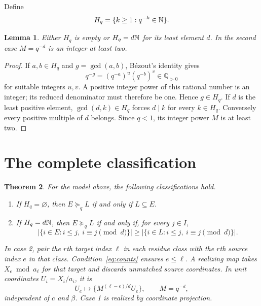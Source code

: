 \documentclass[11pt,a4paper]{article}
\newtheorem{theorem}{Theorem}[section]\newtheorem{lemma}[theorem]{Lemma}
\theoremstyle{remark}\newtheorem*{ednote}{Editorial note (ProveIt, 2026-10-01)}
\begin{document}
Define
\begin{equation}\label{eq:H}
 H_q=\{k\ge1:q^{-k}\in\mathbb N\}.
\end{equation}

\begin{lemma}\label{lem:arithmetic}
Either $H_q$ is empty or $H_q=d\mathbb N$ for its least element $d$. In the second case $M=q^{-d}$ is an integer at least two.
\end{lemma}
\begin{proof}
If $a,b\in H_q$ and $g=\gcd(a,b)$, B\'ezout's identity gives
\[
 q^{-g}=(q^{-a})^u(q^{-b})^v\in\mathbb Q_{>0}
\]
for suitable integers $u,v$. A positive integer power of this rational number is an integer; its reduced denominator must therefore be one. Hence $g\in H_q$. If $d$ is the least positive element, $\gcd(d,k)\in H_q$ forces $d\mid k$ for every $k\in H_q$. Conversely every positive multiple of $d$ belongs. Since $q<1$, its integer power $M$ is at least two.
\end{proof}

\section{The complete classification}
\begin{theorem}\label{thm:main}
For the model above, the following classifications hold.
\begin{enumerate}
 \item If $H_q=\varnothing$, then $E\succeq_q L$ if and only if $L\subseteq E$.
 \item If $H_q=d\mathbb N$, then $E\succeq_q L$ if and only if, for every $j\in I$,
 \begin{equation}\label{eq:counts}
 \bigl|\{i\in E:i\le j,\ i\equiv j\pmod d\}\bigr|
 \ge
 \bigl|\{i\in L:i\le j,\ i\equiv j\pmod d\}\bigr|.
 \end{equation}
\end{enumerate}
In case 2, pair the $r$th target index $\ell$ in each residue class with the $r$th source index $e$ in that class. Condition~\eqref{eq:counts} ensures $e\le\ell$. A realizing map takes $X_e\bmod a_\ell$ for that target and discards unmatched source coordinates. In unit coordinates $U_i=X_i/a_i$, it is
\begin{equation}\label{eq:unitmap}
 U_e\longmapsto\{M^{(\ell-e)/d}U_e\},
 \qquad M=q^{-d},
\end{equation}
independent of $c$ and $\beta$. Case 1 is realized by coordinate projection.
\end{theorem}
\end{document}
